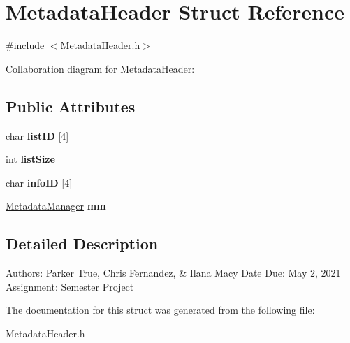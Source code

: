 \hypertarget{structMetadataHeader}{}\section{Metadata\+Header Struct Reference}
\label{structMetadataHeader}


{\ttfamily \#include $<$Metadata\+Header.\+h$>$}



Collaboration diagram for Metadata\+Header\+:
\subsection*{Public Attributes}
\begin{DoxyCompactItemize}
\item 
\mbox{\label{structMetadataHeader_ac337fc72c9ae30daa7e2e9df57cbf08c}} 
char {\bfseries list\+ID} \mbox{[}4\mbox{]}
\item 
\mbox{\label{structMetadataHeader_ad3bf1dfe7faecd43c79d3d9c81319e2b}} 
int {\bfseries list\+Size}
\item 
\mbox{\label{structMetadataHeader_aee40eba0102ce906a77af6ce2f344b44}} 
char {\bfseries info\+ID} \mbox{[}4\mbox{]}
\item 
\mbox{\label{structMetadataHeader_a4e9ac5e747d9d24bea5f0675fd243540}} 
\hyperlink{classMetadataManager}{Metadata\+Manager} {\bfseries mm}
\end{DoxyCompactItemize}


\subsection{Detailed Description}
Authors\+: Parker True, Chris Fernandez, \& Ilana Macy Date Due\+: May 2, 2021 Assignment\+: Semester Project 

The documentation for this struct was generated from the following file\+:\begin{DoxyCompactItemize}
\item 
Metadata\+Header.\+h\end{DoxyCompactItemize}
